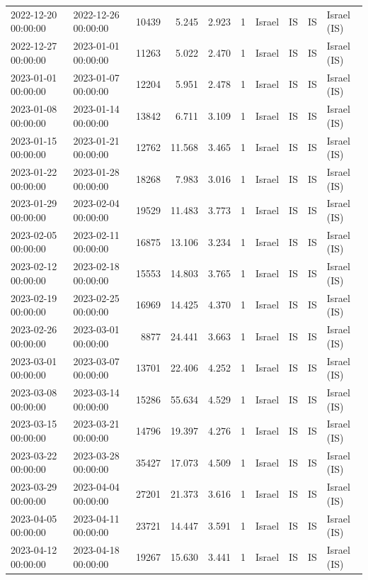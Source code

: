 \begin{tabular}{llrrrlllll}
2022-12-20 00:00:00 & 2022-12-26 00:00:00 & 10439 & 5.245 & 2.923 & 1 & Israel & IS & IS & Israel (IS) \\
2022-12-27 00:00:00 & 2023-01-01 00:00:00 & 11263 & 5.022 & 2.470 & 1 & Israel & IS & IS & Israel (IS) \\
2023-01-01 00:00:00 & 2023-01-07 00:00:00 & 12204 & 5.951 & 2.478 & 1 & Israel & IS & IS & Israel (IS) \\
2023-01-08 00:00:00 & 2023-01-14 00:00:00 & 13842 & 6.711 & 3.109 & 1 & Israel & IS & IS & Israel (IS) \\
2023-01-15 00:00:00 & 2023-01-21 00:00:00 & 12762 & 11.568 & 3.465 & 1 & Israel & IS & IS & Israel (IS) \\
2023-01-22 00:00:00 & 2023-01-28 00:00:00 & 18268 & 7.983 & 3.016 & 1 & Israel & IS & IS & Israel (IS) \\
2023-01-29 00:00:00 & 2023-02-04 00:00:00 & 19529 & 11.483 & 3.773 & 1 & Israel & IS & IS & Israel (IS) \\
2023-02-05 00:00:00 & 2023-02-11 00:00:00 & 16875 & 13.106 & 3.234 & 1 & Israel & IS & IS & Israel (IS) \\
2023-02-12 00:00:00 & 2023-02-18 00:00:00 & 15553 & 14.803 & 3.765 & 1 & Israel & IS & IS & Israel (IS) \\
2023-02-19 00:00:00 & 2023-02-25 00:00:00 & 16969 & 14.425 & 4.370 & 1 & Israel & IS & IS & Israel (IS) \\
2023-02-26 00:00:00 & 2023-03-01 00:00:00 & 8877 & 24.441 & 3.663 & 1 & Israel & IS & IS & Israel (IS) \\
2023-03-01 00:00:00 & 2023-03-07 00:00:00 & 13701 & 22.406 & 4.252 & 1 & Israel & IS & IS & Israel (IS) \\
2023-03-08 00:00:00 & 2023-03-14 00:00:00 & 15286 & 55.634 & 4.529 & 1 & Israel & IS & IS & Israel (IS) \\
2023-03-15 00:00:00 & 2023-03-21 00:00:00 & 14796 & 19.397 & 4.276 & 1 & Israel & IS & IS & Israel (IS) \\
2023-03-22 00:00:00 & 2023-03-28 00:00:00 & 35427 & 17.073 & 4.509 & 1 & Israel & IS & IS & Israel (IS) \\
2023-03-29 00:00:00 & 2023-04-04 00:00:00 & 27201 & 21.373 & 3.616 & 1 & Israel & IS & IS & Israel (IS) \\
2023-04-05 00:00:00 & 2023-04-11 00:00:00 & 23721 & 14.447 & 3.591 & 1 & Israel & IS & IS & Israel (IS) \\
2023-04-12 00:00:00 & 2023-04-18 00:00:00 & 19267 & 15.630 & 3.441 & 1 & Israel & IS & IS & Israel (IS) \\

\end{tabular}
